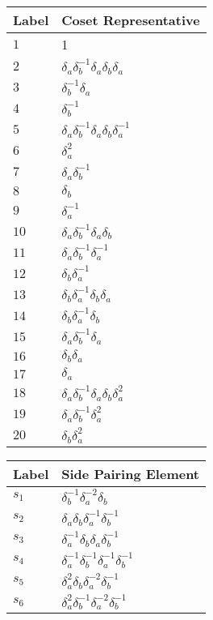 \documentclass{article}
\begin{document}
\begin{center}
\begin{tabular}{ll}
\toprule
Label & Coset Representative\\
\midrule
$1$ & 1 \\
$2$ & $\delta_a^{}\delta_b^{-1}\delta_a^{}\delta_b^{}\delta_a^{}$ \\
$3$ & $\delta_b^{-1}\delta_a^{}$ \\
$4$ & $\delta_b^{-1}$ \\
$5$ & $\delta_a^{}\delta_b^{-1}\delta_a^{}\delta_b^{}\delta_a^{-1}$ \\
$6$ & $\delta_a^{2}$ \\
$7$ & $\delta_a^{}\delta_b^{-1}$ \\
$8$ & $\delta_b^{}$ \\
$9$ & $\delta_a^{-1}$ \\
$10$ & $\delta_a^{}\delta_b^{-1}\delta_a^{}\delta_b^{}$ \\
$11$ & $\delta_a^{}\delta_b^{-1}\delta_a^{-1}$ \\
$12$ & $\delta_b^{}\delta_a^{-1}$ \\
$13$ & $\delta_b^{}\delta_a^{-1}\delta_b^{}\delta_a^{}$ \\
$14$ & $\delta_b^{}\delta_a^{-1}\delta_b^{}$ \\
$15$ & $\delta_a^{}\delta_b^{-1}\delta_a^{}$ \\
$16$ & $\delta_b^{}\delta_a^{}$ \\
$17$ & $\delta_a^{}$ \\
$18$ & $\delta_a^{}\delta_b^{-1}\delta_a^{}\delta_b^{}\delta_a^{2}$ \\
$19$ & $\delta_a^{}\delta_b^{-1}\delta_a^{2}$ \\
$20$ & $\delta_b^{}\delta_a^{2}$ \\
\bottomrule
\end{tabular}
\hfill
\begin{tabular}{ll}
\toprule
Label & Side Pairing Element\\
\midrule
$s_{1}$ & $\delta_b^{-1}\delta_a^{-2}\delta_b^{}$ \\
$s_{2}$ & $\delta_a^{}\delta_b^{}\delta_a^{-1}\delta_b^{-1}$ \\
$s_{3}$ & $\delta_a^{-1}\delta_b^{}\delta_a^{}\delta_b^{-1}$ \\
$s_{4}$ & $\delta_a^{-1}\delta_b^{-1}\delta_a^{-1}\delta_b^{-1}$ \\
$s_{5}$ & $\delta_a^{2}\delta_b^{}\delta_a^{-2}\delta_b^{-1}$ \\
$s_{6}$ & $\delta_a^{2}\delta_b^{-1}\delta_a^{-2}\delta_b^{-1}$ \\

\end{tabular}
\end{center}
\end{document}
